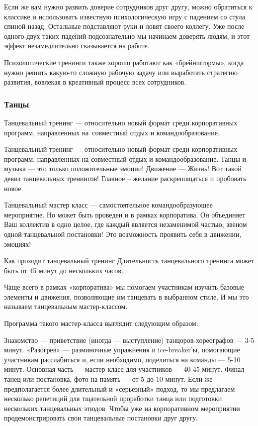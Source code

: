\documentclass{../industrial-development}
\begin{document}
Если же вам нужно развить доверие сотрудников друг другу, можно обратиться к классике и использовать известную психологическую игру с падением со стула спиной назад. Остальные подставляют руки и ловят своего коллегу. Уже после одного-двух таких падений подсознательно мы начинаем доверять людям, и этот эффект незамедлительно сказывается на работе.

Психологические тренинги также хорошо работают как «брейнштормы», когда нужно решить какую-то сложную рабочую задачу или выработать стратегию развития, вовлекая в креативный процесс всех сотрудников.

\begin{frame} \frametitle{Танцы}
\alert{Танцевальный тренинг} — относительно новый формат среди корпоративных программ, направленных на~совместный отдых и командообразование.
\end{frame}

\lecturenotes

Танцевальный тренинг — относительно новый формат среди корпоративных программ, направленных на совместный отдых и командообразование. Танцы и музыка — это только положительные эмоции! Движение — Жизнь! Вот такой девиз танцевальных тренингов! Главное – желание раскрепощаться и пробовать новое.

Танцевальный мастер класс — самостоятельное командообразующее мероприятие. Но может быть проведен и в рамках корпоратива. Он объединяет Ваш коллектив в одно целое, где каждый является незаменимой частью, звеном одной танцевальной постановки! Это возможность проявить себя в движении, эмоциях!

Как проходит танцевальный тренинг
Длительность танцевального тренинга может быть от 45 минут до нескольких часов.

Чаще всего в рамках «корпоратива» мы помогаем участникам изучить базовые элементы и движения, позволяющие им танцевать в выбранном стиле. И мы это называем танцевальным мастер-классом.

Программа такого мастер-класса выглядит следующим образом:

Знакомство —  приветствие (иногда — выступление) танцоров-хореографов — 3-5 минут.
«Разогрев» — разминочные упражнения и ice-breaker’ы, помогающие участникам расслабиться и, если необходимо, поделиться на команды — 5-10 минут.
 Основная часть — мастер-класс для участников — 40-45 минут.
Финал — танец или постановка, фото на память — от 5 до 10 минут.
Если же предполагается более длительный и «серьезный» подход, то мы предлагаем несколько репетиций для тщательной проработки танца или подготовки нескольких танцевальных этюдов. Чтобы  уже на корпоративном мероприятии продемонстрировать свои танцевальные постановки друг другу.
\end{document}
